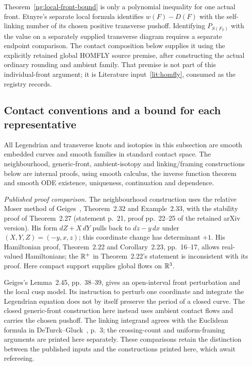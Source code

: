\begin{remark}\label{ng:consumer-boundary}
Theorem~\ref{ng:local-front-bound} is only a polynomial inequality for
one actual front. Etnyre's separate local formula identifies
$w(F)-D(F)$ with the self-linking number of its chosen positive
transverse pushoff. Identifying $P_{S(F_T)}$ with the value on a
separately supplied transverse diagram requires a separate endpoint
comparison. The contact composition below supplies it using the
explicitly retained global HOMFLY source premise, after constructing
the actual ordinary rounding and ambient family. That premise is not
part of this individual-front argument; it is
Literature input~\ref{lit:homfly}, consumed as the registry records.
\end{remark}

\subsection{Contact conventions and a bound for each representative}

All Legendrian and transverse knots and isotopies in this subsection are
smooth embedded curves and smooth families in standard contact space.
The neighbourhood, generic-front, ambient-isotopy and linking/framing
constructions below are internal proofs, using smooth calculus, the inverse
function theorem and smooth ODE existence, uniqueness, continuation and
dependence.

\par\noindent\emph{Published proof comparison.}
The neighbourhood construction uses the relative Moser method of
Geiges~\cite{GeigesContact}, Theorem~2.32 and Example~2.33, with
the stability proof of Theorem~2.27 (statement p.~21, proof pp.~22--25 of
the retained arXiv version).
His form $dZ+X\,dY$ pulls back to $dz-y\,dx$ under
$(X,Y,Z)=(-y,x,z)$; this coordinate change has determinant $+1$.
His Hamiltonian proof, Theorem~2.22 and Corollary~2.23,
pp.~16--17, allows real-valued Hamiltonians; the $\mathbb R^+$ in
Theorem~2.22's statement is inconsistent with its proof.
Here compact support supplies global flows on $\mathbb R^3$.

Geiges's Lemma~2.45, pp.~38--39, gives an open-interval
front perturbation and the local cusp model. Its instruction to
perturb one coordinate and integrate the Legendrian equation does
not by itself preserve the period of a closed curve. The closed
generic-front construction here instead uses ambient contact flows
and carries the chosen pushoff. The linking integrand agrees with
the Euclidean formula in DeTurck--Gluck~\cite{DeTurckGluckLinking},
p.~3; the crossing-count and uniform-framing arguments are printed
here separately. These comparisons retain the distinction between
the published inputs and the constructions printed here, which await refereeing.

